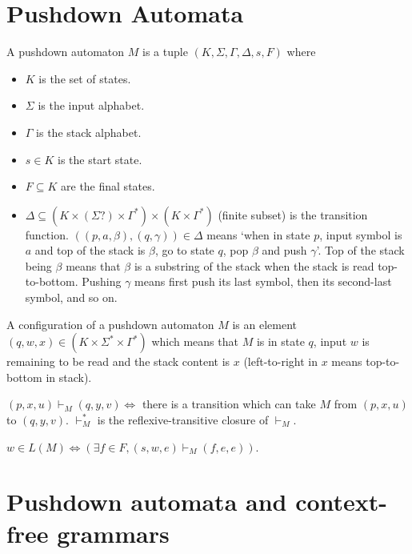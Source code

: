 \section{Pushdown Automata}

\begin{definition}
A pushdown automaton $M$ is a tuple $(K, \Sigma, \Gamma, \Delta, s, F)$ where
\begin{itemize}
\item $K$ is the set of states.
\item $\Sigma$ is the input alphabet.
\item $\Gamma$ is the stack alphabet.
\item $s \in K$ is the start state.
\item $F \subseteq K$ are the final states.
\item $\Delta \subseteq (K \times (\Sigma?) \times \Gamma^*) \times (K \times \Gamma^*)$
    (finite subset) is the transition function.
    $((p, a, \beta), (q, \gamma)) \in \Delta$ means `when in state $p$, input symbol is $a$
    and top of the stack is $\beta$, go to state $q$, pop $\beta$ and push $\gamma$'.
    Top of the stack being $\beta$ means that $\beta$ is a substring of the stack when the stack is read top-to-bottom.
    Pushing $\gamma$ means first push its last symbol, then its second-last symbol, and so on.
\end{itemize}
\end{definition}
\begin{definition}
A configuration of a pushdown automaton $M$ is an element $(q, w, x) \in (K \times \Sigma^* \times \Gamma^*)$
which means that $M$ is in state $q$, input $w$ is remaining to be read and the stack content is $x$
(left-to-right in $x$ means top-to-bottom in stack).
\end{definition}
\begin{definition}
$(p, x, u) \vdash_M (q, y, v) \iff $ there is a transition
which can take $M$ from $(p, x, u)$ to $(q, y, v)$.
$\vdash_M^*$ is the reflexive-transitive closure of $\vdash_M$.
\end{definition}
\begin{definition}
$w \in L(M) \iff (\exists f \in F, (s, w, e) \vdash_M (f, e, e))$.
\end{definition}

\section{Pushdown automata and context-free grammars}

